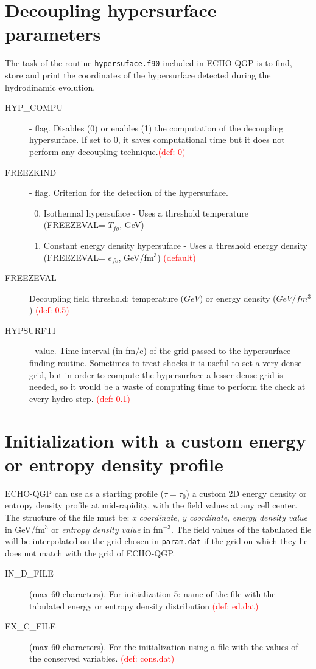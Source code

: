 \section{Decoupling hypersurface parameters}
The task of the routine {\tt hypersuface.f90} included in ECHO-QGP is to find, store and print the coordinates of the hypersurface detected during the hydrodinamic evolution.
\begin{description}
\item[HYP\_COMPU] \integer - flag. Disables (0) or enables (1) the computation of the decoupling hypersurface. If set to 0, it saves
computational time but it does not perform any decoupling technique.\textcolor{red}{(def: 0)}
\item[FREEZKIND] \integer - flag. Criterion for the detection of the hypersurface.
\begin{enumerate} \setcounter{enumi}{-1}
 \item  Isothermal hypersuface - Uses a threshold temperature (FREEZEVAL= $T_{fo}$, GeV) 
 \item  Constant energy
density hypersuface - Uses a threshold energy density (FREEZEVAL= $e_{fo}$, GeV/fm$^3$) \textcolor{red}{(default)}
\end{enumerate}
\item[FREEZEVAL] Decoupling field  threshold: temperature ($GeV$) or energy density ($GeV/fm^3$) \textcolor{red}{(def: 0.5)}
 \item[HYPSURFTI]  \real - value. Time interval (in fm/c) of the grid passed to the hypersurface-finding routine. Sometimes to treat shocks it is useful to set a very dense grid, but in order to compute the hypersurface a lesser dense grid is needed, so it would be a waste of computing time to perform the check at every hydro step.  \textcolor{red}{(def: 0.1)}
\end{description}

\section{Initialization with a custom energy or entropy density profile}
ECHO-QGP can use as a starting profile ($\tau=\tau_0$) a custom 2D energy density or entropy density profile at mid-rapidity, with the field values at any cell center. 
The structure of the file must be: \emph{x coordinate}, \emph{y coordinate}, \emph{energy density value} in GeV/fm$^3$ or  \emph{entropy density value} in fm$^{-3}$. The field values of the tabulated file will be interpolated on the grid chosen in {\tt param.dat} if the grid on which they lie does not match with the grid of ECHO-QGP.
\begin{description}
\item[IN\_D\_FILE] \chara (max 60 characters). For initialization 5: name of the file with the tabulated energy or entropy density distribution  \textcolor{red}{(def: ed.dat)}
\item[EX\_C\_FILE] \chara (max 60 characters). For the initialization using a file with the values of the conserved variables. \textcolor{red}{(def: cons.dat)}
\end{description} 

